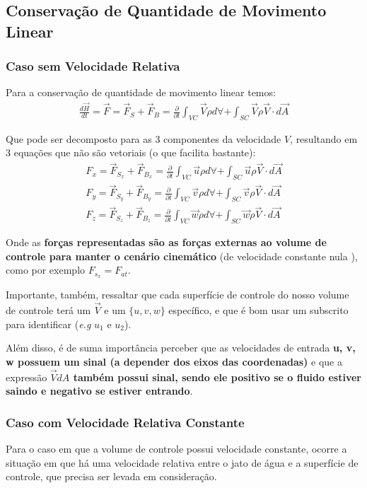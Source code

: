 \documentclass{article}
\newcommand{\n}{\nonumber \\ }
\begin{document}
\subsection{Conservação de Quantidade de Movimento Linear}
\subsubsection{Caso sem Velocidade Relativa}
Para a conservação de quantidade de movimento linear temos:
\begin{align}
    \frac{d \vec H}{dt} = \vec F = \vec F_S + \vec F_B = \frac{\partial}{\partial t} \int_{VC} \vec V \rho d\forall + \int_{SC}\vec V \rho \vec V \cdot d \vec A
\end{align}

Que pode ser decomposto para as 3 componentes da velocidade $V$, resultando em 3 equações que não são vetoriais (o que facilita bastante):
\begin{align}
    F_x = \vec F_{S_x} + \vec F_{B_x} = \frac{\partial}{\partial t} \int_{VC} \vec u \rho d\forall + \int_{SC}\vec u \rho \vec V \cdot d \vec A \n
    F_y = \vec F_{S_y} + \vec F_{B_y} = \frac{\partial}{\partial t} \int_{VC} \vec v \rho d\forall + \int_{SC}\vec v \rho \vec V \cdot d \vec A \n
    F_z = \vec F_{S_z} + \vec F_{B_z} = \frac{\partial}{\partial t} \int_{VC} \vec w \rho d\forall + \int_{SC}\vec w \rho \vec V \cdot d \vec A
    \label{eq:cons_quan_movi_lin}
\end{align}

Onde as \textbf{forças representadas são as forças externas ao volume de controle para manter o cenário cinemático} (de velocidade constante nula ), como por exemplo $F_{s_x} = F_{at}$.

Importante, também, ressaltar que cada superfície de controle do nosso volume de controle terá um $\vec V$ e um $\{u, v, w\}$ específico, e que é bom usar um subscrito para identificar (\emph{e.g} $u_1$ e $u_2$).

Além disso, é de suma importância perceber que as velocidades de entrada \textbf{{u, v, w} possuem um sinal (a depender dos eixos das coordenadas)} e que a expressão \textbf{$\vec V dA$ também possui sinal, sendo ele positivo se o fluido estiver saindo e negativo se estiver entrando}.

\subsubsection{Caso com Velocidade Relativa Constante}
Para o caso em que a volume de controle possui velocidade constante, ocorre a situação em que há uma velocidade relativa entre o jato de água e a superfície de controle, que precisa ser levada em consideração.
\end{document}
